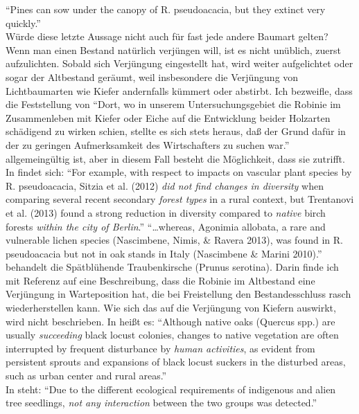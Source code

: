 \documentclass[twocolumn]{scrartcl}
\begin{document}
\enquote{Pines can sow under the canopy of R. pseudoacacia, but they
  extinct very quickly.}\\
Würde diese letzte Aussage nicht auch für fast jede andere Baumart
gelten? Wenn man einen Bestand natürlich verjüngen will, ist es nicht
unüblich, zuerst aufzulichten. Sobald sich Verjüngung eingestellt hat,
wird weiter aufgelichtet oder sogar der Altbestand geräumt, weil
insbesondere die Verjüngung von Lichtbaumarten wie Kiefer andernfalls
kümmert oder abstirbt. Ich bezweifle, dass die Feststellung
von \citet[S.~90]{erteld1952robinieErtrag}
\enquote{Dort, wo in unserem Untersuchungsgebiet die Robinie im
  Zusammenleben mit Kiefer oder Eiche auf die Entwicklung beider
  Holzarten schädigend zu wirken schien, stellte es sich stets heraus,
  daß der Grund dafür in der zu geringen Aufmerksamkeit des
  Wirtschafters zu suchen war.}
allgemeingültig ist, aber in diesem Fall besteht die Möglichkeit, dass
sie zutrifft.\\
In \cite{campagnaro2018alien} findet sich:
\enquote{For example, with respect to impacts on vascular plant
  species by R.  pseudoacacia, Sitzia et al. (2012) \emph{did not find
  changes in diversity} when comparing several recent secondary
  \emph{forest types} in a rural context, but Trentanovi et al. (2013)
  found a strong reduction in diversity compared to \emph{native}
  birch forests \emph{within the city of Berlin}.}
\enquote{\dots whereas, Agonimia allobata, a rare and vulnerable
  lichen species (Nascimbene, Nimis, \& Ravera 2013), was found in
  R. pseudoacacia but not in oak stands in Italy (Nascimbene \& Marini
  2010).}\\
\citet{sebert2007invasive} behandelt die Spätblühende Traubenkirsche
(Prunus serotina). Darin finde ich mit Referenz auf
\citet{lee2004robinie} eine Beschreibung, dass die Robinie im
Altbestand eine Verjüngung in Warteposition hat, die bei
Freistellung den Bestandesschluss rasch wiederherstellen kann. Wie
sich das auf die Verjüngung von Kiefern auswirkt, wird nicht
beschrieben. In \citet{lee2004robinie} heißt es:
\enquote{Although native oaks (Quercus spp.) are usually
  \emph{succeeding} black locust colonies, changes to native
  vegetation are often interrupted by frequent disturbance by
  \emph{human activities}, as evident from persistent sprouts and
  expansions of black locust suckers in the disturbed areas, such as
  urban center and rural areas.}\\
In \citet{maringer2012robinePostFire} steht:
\enquote{Due to the different ecological requirements of indigenous
  and alien tree seedlings, \emph{not any interaction} between the two
  groups was detected.}\\
\end{document}
